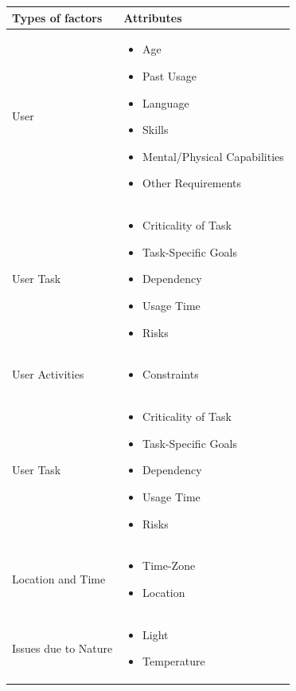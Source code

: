 \documentclass[15pt]{article}
\begin{document}
\begin{center}
\begin{longtable}{| p{} | p{} |} 
 \hline
  {\bfseries Types of factors}\citep{dey2001understanding} & {\bfseries Attributes} \\ [0.5ex] 
 \hline
 User & 
 \begin{itemize}
  \item Age
  \item Past Usage
  \item Language
  \item Skills
  \item Mental/Physical Capabilities
  \item Other Requirements
  \end{itemize}  \\ 
 \hline
 
User Task
 &  \begin{itemize}
  \item Criticality of Task
  \item Task-Specific Goals
  \item Dependency
  \item Usage Time
  \item Risks
  \end{itemize}   \\
 \hline
 
User Activities
 &  \begin{itemize}
  \item Constraints
  \end{itemize}   \\
 \hline
 
 User Task
 &  \begin{itemize}
  \item Criticality of Task
  \item Task-Specific Goals
  \item Dependency
  \item Usage Time
  \item Risks
  \end{itemize}   \\
 \hline

Location and Time
 &  \begin{itemize}
  \item Time-Zone
  \item Location
  \end{itemize}   \\
 \hline
 
Issues due to Nature
 &  \begin{itemize}
  \item Light
  \item Temperature
  \end{itemize}   \\
 \hline
 

\end{longtable}
\end{center}
\end{document}
